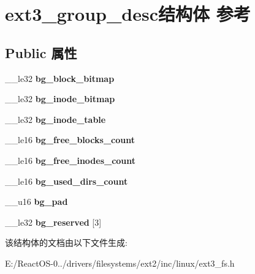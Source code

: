 \hypertarget{structext3__group__desc}{}\section{ext3\+\_\+group\+\_\+desc结构体 参考}
\label{structext3__group__desc}
\subsection*{Public 属性}
\begin{DoxyCompactItemize}
\item 
\mbox{\label{structext3__group__desc_ae5342882e009c8e57c2e1092b30ef0df}} 
\+\_\+\+\_\+le32 {\bfseries bg\+\_\+block\+\_\+bitmap}
\item 
\mbox{\label{structext3__group__desc_a71d0ba51746038840b774493ffe9c7c3}} 
\+\_\+\+\_\+le32 {\bfseries bg\+\_\+inode\+\_\+bitmap}
\item 
\mbox{\label{structext3__group__desc_af7c3015d423587889c76e4dbb2434d04}} 
\+\_\+\+\_\+le32 {\bfseries bg\+\_\+inode\+\_\+table}
\item 
\mbox{\label{structext3__group__desc_a5e4b04db57c41b83cf08956f605ce08c}} 
\+\_\+\+\_\+le16 {\bfseries bg\+\_\+free\+\_\+blocks\+\_\+count}
\item 
\mbox{\label{structext3__group__desc_a48f8ba5680c35be8ea63002c4953f9ee}} 
\+\_\+\+\_\+le16 {\bfseries bg\+\_\+free\+\_\+inodes\+\_\+count}
\item 
\mbox{\label{structext3__group__desc_a0d9b2066a306ab9b960e2caa59b929fb}} 
\+\_\+\+\_\+le16 {\bfseries bg\+\_\+used\+\_\+dirs\+\_\+count}
\item 
\mbox{\label{structext3__group__desc_a456d78d863db21aac80ed2448fe5a7f2}} 
\+\_\+\+\_\+u16 {\bfseries bg\+\_\+pad}
\item 
\mbox{\label{structext3__group__desc_a6d3adc6517a02fe8333fd5d2d523b9d3}} 
\+\_\+\+\_\+le32 {\bfseries bg\+\_\+reserved} \mbox{[}3\mbox{]}
\end{DoxyCompactItemize}


该结构体的文档由以下文件生成\+:\begin{DoxyCompactItemize}
\item 
E\+:/\+React\+O\+S-\/0../drivers/filesystems/ext2/inc/linux/ext3\+\_\+fs.\+h\end{DoxyCompactItemize}
